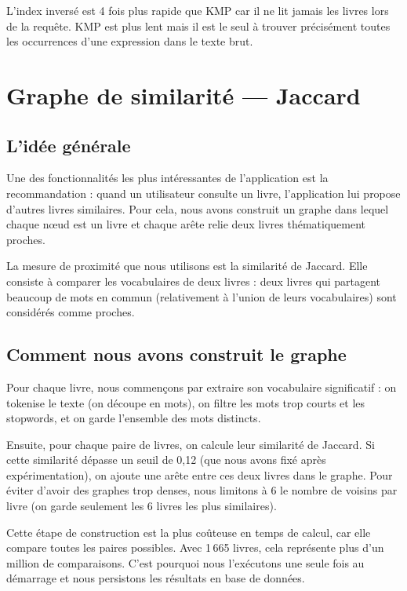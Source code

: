 \documentclass[12pt,a4paper]{article}
\begin{document}
L'index inversé est 4 fois plus rapide que KMP car il ne lit jamais les
livres lors de la requête. KMP est plus lent mais il est le seul à trouver
précisément toutes les occurrences d'une expression dans le texte brut.

\section{Graphe de similarité — Jaccard}

\subsection{L'idée générale}

Une des fonctionnalités les plus intéressantes de l'application est la
recommandation : quand un utilisateur consulte un livre, l'application lui
propose d'autres livres similaires. Pour cela, nous avons construit un graphe
dans lequel chaque nœud est un livre et chaque arête relie deux livres
thématiquement proches.

La mesure de proximité que nous utilisons est la similarité de Jaccard.
Elle consiste à comparer les vocabulaires de deux livres : deux livres qui
partagent beaucoup de mots en commun (relativement à l'union de leurs
vocabulaires) sont considérés comme proches.

\subsection{Comment nous avons construit le graphe}

Pour chaque livre, nous commençons par extraire son vocabulaire significatif :
on tokenise le texte (on découpe en mots), on filtre les mots trop courts
et les stopwords, et on garde l'ensemble des mots distincts.

Ensuite, pour chaque paire de livres, on calcule leur similarité de Jaccard.
Si cette similarité dépasse un seuil de 0,12 (que nous avons fixé après
expérimentation), on ajoute une arête entre ces deux livres dans le graphe.
Pour éviter d'avoir des graphes trop denses, nous limitons à 6 le nombre de
voisins par livre (on garde seulement les 6 livres les plus similaires).

Cette étape de construction est la plus coûteuse en temps de calcul, car
elle compare toutes les paires possibles. Avec 1\,665 livres, cela représente
plus d'un million de comparaisons. C'est pourquoi nous l'exécutons une seule
fois au démarrage et nous persistons les résultats en base de données.
\end{document}
